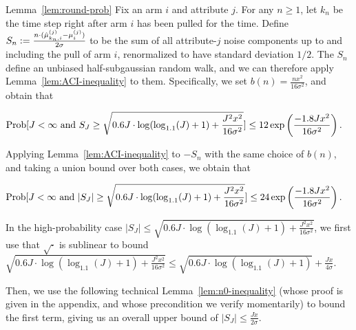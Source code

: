 \begin{extraproof}{Lemma~\ref{lem:round-prob}}
Fix an arm $i$ and attribute $j$.
For any $n \geq 1$, let $k_n$ be the time step right after arm $i$ has
been pulled for the  time.
Define
$S_n := \frac{n \cdot (\hat{\mu}_{k_n,i}^{(j)} - \mu_{i}^{(j)})}{2 \sigma}$
to be the sum of all attribute-$j$ noise components up to and
including the  pull of arm $i$,
renormalized to have standard deviation $1/2$.
The $S_n$ define an unbiased half-subgaussian random walk,
and we can therefore apply Lemma~\ref{lem:ACI-inequality} to them.
Specifically, we set $b(n) = \frac{n x^2}{16 \sigma^2}$,
and obtain that

\begin{align*}
\Prob{J < \infty \mbox{ and } S_J \geq 
\sqrt{0.6 J \cdot \log (\log_{1.1}(J) + 1) + \frac{J^2 x^2}{16 \sigma^2}}}
& \leq 12 \exp \left( \frac{-1.8 J x^2}{16 \sigma^2} \right).
\end{align*}

Applying Lemma~\ref{lem:ACI-inequality} to $-S_n$ with the same choice
of $b(n)$, and taking a union bound over both cases, we obtain that

\begin{align*}
\Prob{J < \infty \mbox{ and } |S_J| \geq 
\sqrt{0.6 J \cdot \log (\log_{1.1}(J) + 1) + \frac{J^2 x^2}{16 \sigma^2}}}
& \leq 24 \exp \left( \frac{-1.8 J x^2}{16 \sigma^2} \right).
\end{align*}

In the high-probability case
$|S_J| \leq
\sqrt{0.6 J \cdot \log (\log_{1.1}(J) + 1) + \frac{J^2 x^2}{16 \sigma^2}}$,
we first use that $\sqrt{\cdot}$ is sublinear to bound
$\sqrt{0.6 J \cdot \log (\log_{1.1}(J) + 1) + \frac{J^2 x^2}{16 \sigma^2}}
\leq \sqrt{0.6 J \cdot \log (\log_{1.1}(J) + 1)} + \frac{J x}{4 \sigma}$.


Then, we use the following technical Lemma~\ref{lem:n0-inequality}
(whose proof is given in the appendix, and whose precondition we verify
momentarily) to bound the first term,
giving us an overall upper bound of
$|S_J| \leq \frac{J x}{2 \sigma}$.


\end{extraproof}
